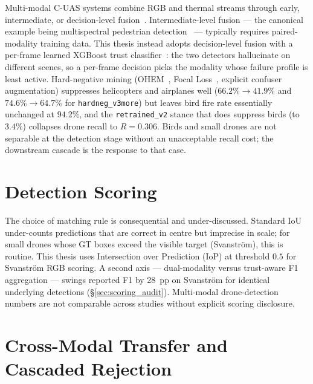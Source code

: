 Multi-modal C-UAS systems combine RGB and thermal streams through early, intermediate, or decision-level fusion~\cite{ramachandram2017fusion}. Intermediate-level fusion --- the canonical example being multispectral pedestrian detection~\cite{wagner2016multispectral} --- typically requires paired-modality training data. This thesis instead adopts decision-level fusion with a per-frame learned XGBoost trust classifier~\cite{chen2016xgboost,friedman2001greedy}: the two detectors hallucinate on different scenes, so a per-frame decision picks the modality whose failure profile is least active. Hard-negative mining (OHEM~\cite{shrivastava2016ohem}, Focal Loss~\cite{lin2017focal}, explicit confuser augmentation) suppresses helicopters and airplanes well ($66.2\% \to 41.9\%$ and $74.6\% \to 64.7\%$ for \texttt{hardneg\_v3more}) but leaves bird fire rate essentially unchanged at $94.2\%$, and the \texttt{retrained\_v2} stance that does suppress birds (to $3.4\%$) collapses drone recall to $R=0.306$. Birds and small drones are not separable at the detection stage without an unacceptable recall cost; the downstream cascade is the response to that case.

\section{Detection Scoring}
\label{sec:lit_calibration}

The choice of matching rule is consequential and under-discussed. Standard IoU under-counts predictions that are correct in centre but imprecise in scale; for small drones whose GT boxes exceed the visible target (Svanstr\"om), this is routine. This thesis uses Intersection over Prediction (IoP) at threshold $0.5$ for Svanstr\"om RGB scoring. A second axis --- dual-modality versus trust-aware F1 aggregation --- swings reported F1 by 28~pp on Svanstr\"om for identical underlying detections (\S\ref{sec:scoring_audit}). Multi-modal drone-detection numbers are not comparable across studies without explicit scoring disclosure.

\section{Cross-Modal Transfer and Cascaded Rejection}
\label{sec:lit_xmodal_cascade}

